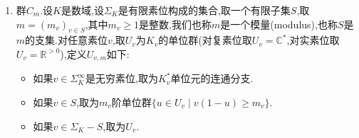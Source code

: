 \begin{enumerate}
\begin{proof}
		对$y\in Y_3$,取一个提升$\overline{y}\in Y_2$.如果$y,y'\in Y_3$,那么有$c(y,y')=\overline{y}+\overline{y'}-\overline{y+y'}\in Y_1$是延拓的一个2-余圈.取一个以$Y_3$为指标集的集合族$\{A_y\mid y\in Y_3\}$,使得每个$A_y=A$,记它们的无交并为$B$.定义$B$上的群结构$\pi_{y,y'}:A_y\times A_{y'}\to A_{y+y'},y,y'\in Y_3$是$A$上的群结构再复合上关于$\varepsilon(c(y,y'))\in A$的平移变换.于是$B$上的零元是$-\varepsilon(\overline{0})$,元$x\in A_y$的逆元是$-x+\varepsilon(\overline{y}+\overline{-y})$.取:
		\begin{itemize}
			\item $A\to B$是典范嵌入$A\to A_0\subseteq B$复合上经$-c(0,0)$的平移变换.
			\item $Y_2\to B(k)$把$\overline{y}+z$,其中$y\in Y_3$和$z\in Y_1$,映为$z-\varepsilon\overline{0}\in A_y$.
		\end{itemize}
		验证$B$和这些态射满足泛性质.最后对$k$的任意域扩张$L$有如下短正合列之间的交换图表:
		$$\xymatrix{0\ar[r]&Y_1\ar[d]\ar[r]&Y_2\ar[d]\ar[r]&Y_3\ar@{=}[d]\ar[r]&0\\0\ar[r]&A(L)\ar[r]&B(L)\ar[r]&Y_3\ar[r]&0}$$
		于是$B$就是关于$Y_3$的常值代数群经$A$的延拓.
	\end{proof}
	\begin{enumerate}[(1)]
		\item 我们构造的扩充群和域扩张的基变换可交换.设$L/k$是域扩张,设$A/k$是代数群,设$A_L=A\times_kL$.那么代数群$A_L/L$关于上述交换群的短正合列以及群同态$\varepsilon:Y_1\to A(k)\to A_L(L)$的扩充群$B'$恰好典范同构于$B\times_kL$.
		\item 【?】我们在下文只考虑$\mathrm{char}(k)=0$和$A$是环面的情况,此时经基域的有限扩张后,$B$总是同构于一个环面和一个有限阿贝尔群的直积.这样的代数群一定被它的特征群$X(B)=\mathrm{Hom}_{\overline{k}}(B_{\overline{k}},\mathbb{G}_{m,\overline{k}})$所决定,这个特征群是一个$G$模,其中$G$是Galois群,并且它是有限型$\mathbb{Z}$代数.
	\end{enumerate}
    \item 群$C_m$.设$K$是数域,设$\Sigma_K$是有限素位构成的集合,取一个有限子集$S$,取$m=(m_v)_{v\in S}$,其中$m_v\ge1$是整数,我们也称$m$是一个模量(modulus),也称$S$是$m$的支集.对任意素位$v$,取$U_v$为$K_v$的单位群(对复素位取$U_v=\mathbb{C}^*$,对实素位取$U_v=\mathbb{R}^{>0}$),定义$U_{v,m}$如下:
    \begin{itemize}
    	\item 如果$v\in\Sigma^{\infty}_K$是无穷素位,取为$K_v^*$单位元的连通分支.
    	\item 如果$v\in S$,取为$m_v$阶单位群$\{u\in U_v\mid v(1-u)\ge m_v\}$.
    	\item 如果$v\in\Sigma_K-S$,取为$U_v$.

\end{itemize}
\end{enumerate}
